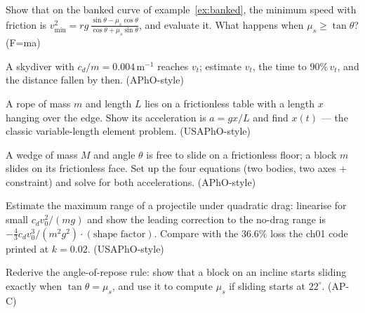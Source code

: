 \begin{exercise}[medium]
Show that on the banked curve of example~\ref{ex:banked}, the minimum speed
with friction is
$v_{\min}^{2}=rg\,\frac{\sin\theta-\mu_s\cos\theta}{\cos\theta+\mu_s\sin\theta}$,
and evaluate it. What happens when $\mu_s\ge\tan\theta$? (F=ma)
\end{exercise}
\begin{exercise}[medium]
A skydiver with $c_d/m=0.004\,\mathrm{m^{-1}}$ reaches $v_t$; estimate
$v_t$, the time to $90\%\,v_t$, and the distance fallen by then. (APhO-style)
\end{exercise}
\begin{exercise}[hard]
A rope of mass $m$ and length $L$ lies on a frictionless table with a
length $x$ hanging over the edge. Show its acceleration is $a=gx/L$ and
find $x(t)$ --- the classic variable-length element problem. (USAPhO-style)
\end{exercise}
\begin{exercise}[hard]
A wedge of mass $M$ and angle $\theta$ is free to slide on a frictionless
floor; a block $m$ slides on its frictionless face. Set up the four
equations (two bodies, two axes + constraint) and solve for both
accelerations. (APhO-style)
\end{exercise}
\begin{exercise}[hard]
Estimate the maximum range of a projectile under quadratic drag:
linearise for small $c_d v_0^{2}/(mg)$ and show the leading correction to
the no-drag range is $-\tfrac{4}{3}c_d v_0^{3}/(m^{2}g^{2})\cdot(\text{shape
factor})$. Compare with the 36.6\% loss the ch01 code printed at
$k=0.02$. (USAPhO-style)
\end{exercise}
\begin{exercise}[medium]
Rederive the angle-of-repose rule: show that a block on an incline starts
sliding exactly when $\tan\theta=\mu_s$, and use it to compute $\mu_s$ if
sliding starts at $22^{\circ}$. (AP-C)
\end{exercise}
